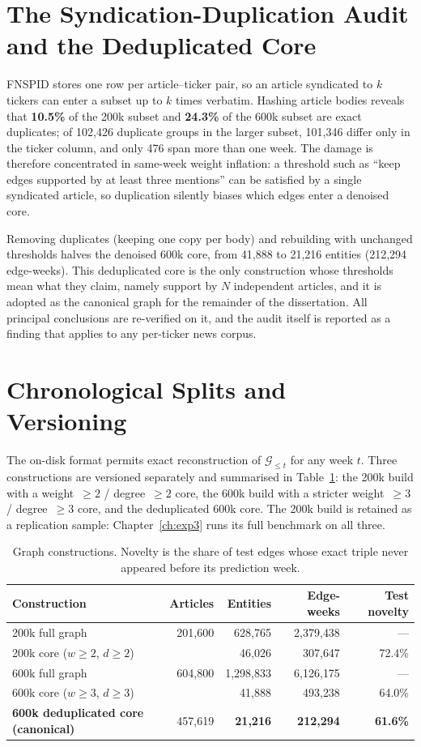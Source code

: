 \documentclass[a4paper,12pt]{report}
\newcommand{\Gle}{\ensuremath{\mathcal{G}_{\leq t}}} %
\begin{document}
\section{The Syndication-Duplication Audit and the Deduplicated Core}
FNSPID stores one row per article--ticker pair, so an article syndicated to
$k$ tickers can enter a subset up to $k$ times verbatim. Hashing article
bodies reveals that \textbf{10.5\%} of the 200k subset and \textbf{24.3\%} of
the 600k subset are exact duplicates; of 102{,}426 duplicate groups in the
larger subset, 101{,}346 differ only in the ticker column, and only 476 span
more than one week. The damage is therefore concentrated in same-week
weight inflation: a threshold such as ``keep edges supported by at least
three mentions'' can be satisfied by a single syndicated article, so
duplication silently biases which edges enter a denoised core.

Removing duplicates (keeping one copy per body) and rebuilding with unchanged
thresholds halves the denoised 600k core, from 41{,}888 to 21{,}216 entities
(212{,}294 edge-weeks). This deduplicated core is the only
construction whose thresholds mean what they claim, namely support by $N$
independent articles, and it is adopted as the canonical graph for the
remainder of the dissertation. All principal conclusions are re-verified on
it, and the audit itself is reported as a finding that applies to any
per-ticker news corpus.

\section{Chronological Splits and Versioning}
The on-disk format permits exact reconstruction of \Gle{} for any week $t$.
Three constructions are versioned separately and summarised in
Table~\ref{tab:constructions}: the 200k build with a weight~$\geq 2$ /
degree~$\geq 2$ core, the 600k build with a stricter weight~$\geq 3$ /
degree~$\geq 3$ core, and the deduplicated 600k core. The 200k build is
retained as a replication sample: Chapter~\ref{ch:exp3} runs its full
benchmark on all three.

\begin{table}[ht]
\centering
\caption{Graph constructions. Novelty is the share of test edges whose exact
triple never appeared before its prediction week.}
\label{tab:constructions}
\begin{tabular}{lrrrr}
\toprule
Construction & Articles & Entities & Edge-weeks & Test novelty \\
\midrule
200k full graph & 201{,}600 & 628{,}765 & 2{,}379{,}438 & --- \\
200k core ($w\geq2$, $d\geq2$) & & 46{,}026 & 307{,}647 & 72.4\% \\
600k full graph & 604{,}800 & 1{,}298{,}833 & 6{,}126{,}175 & --- \\
600k core ($w\geq3$, $d\geq3$) & & 41{,}888 & 493{,}238 & 64.0\% \\
\textbf{600k deduplicated core (canonical)} & 457{,}619 & \textbf{21{,}216}
& \textbf{212{,}294} & \textbf{61.6\%} \\
\bottomrule
\end{tabular}
\end{table}
\end{document}
